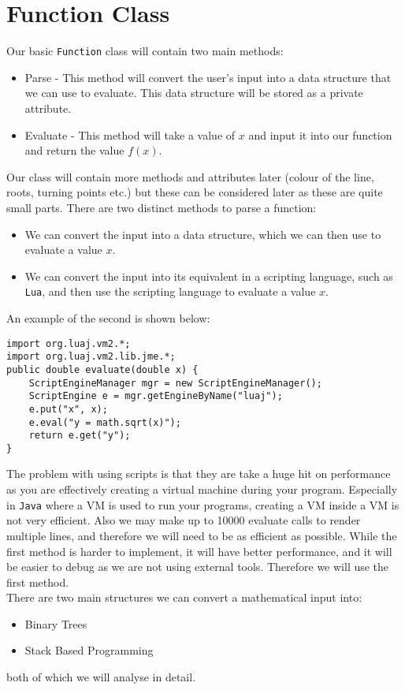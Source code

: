 \documentclass[../../../../main.tex]{subfiles}
\begin{document}
\section{Function Class}	\label{funcClass}
Our basic \texttt{Function} class will contain two main methods:
\begin{itemize}
	\item Parse - This method will convert the user's input into a data structure that we can use to evaluate. This data structure will be stored as a private attribute.
	\item Evaluate - This method will take a value of $x$ and input it into our function and return the value $f(x)$.
\end{itemize}
Our class will contain more methods and attributes later (colour of the line, roots, turning points etc.) but these can be considered later as these are quite small parts. There are two distinct methods to parse a function:
\begin{itemize}
	\item We can convert the input into a data structure, which we can then use to evaluate a value $x$.
	\item We can convert the input into its equivalent in a scripting language, such as \texttt{Lua\cite{lua}}, and then use the scripting language to evaluate a value $x$.
\end{itemize}
An example of the second is shown below:
\begin{verbatim}
import org.luaj.vm2.*;
import org.luaj.vm2.lib.jme.*;
public double evaluate(double x) {
	ScriptEngineManager mgr = new ScriptEngineManager();
	ScriptEngine e = mgr.getEngineByName("luaj");
	e.put("x", x);
	e.eval("y = math.sqrt(x)");
	return e.get("y");	
}
\end{verbatim}
The problem with using scripts is that they are take a huge hit on performance as you are effectively creating a virtual machine during your program. Especially in \texttt{Java} where a VM is used to run your programs, creating a VM inside a VM is not very efficient. Also we may make up to 10000 evaluate calls to render multiple lines, and therefore we will need to be as efficient as possible. While the first method is harder to implement, it will have better performance, and it will be easier to debug as we are not using external tools. Therefore we will use the first method.\\
There are two main structures we can convert a mathematical input into:
\begin{itemize}
	\item Binary Trees
	\item Stack Based Programming
\end{itemize}
both of which we will analyse in detail.
\newpage
\end{document}
